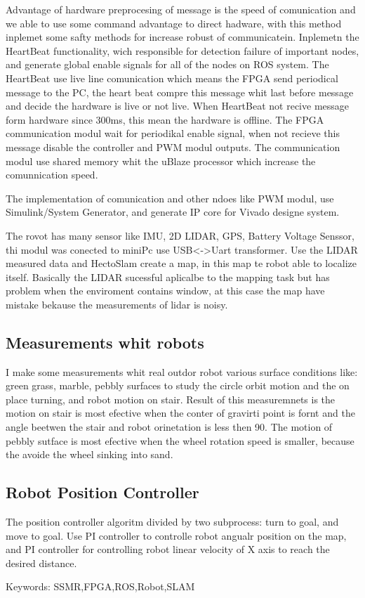 \begin{titlepage}
Advantage of hardware preprocesing of message is the speed of comunication and we able to use some command advantage to direct hadware, with this method inplemet some safty methods for increase robust of communicatein. Inplemetn the HeartBeat functionality, wich 
responsible for detection failure of important nodes, and generate global enable signals for all of the nodes on ROS system. The HeartBeat use live line comunication which means the FPGA send periodical message to the PC, the heart beat compre this message whit last before message and decide the hardware is live or not live. When HeartBeat not recive message form hardware since 300ms, this mean the hardware is offline. The FPGA communication modul wait for periodikal enable signal, when not recieve this message disable the controller and PWM modul outputs.
The communication modul use shared memory whit the uBlaze processor which increase the comunnication speed.

The implementation of comunication and other ndoes like PWM modul, use Simulink/System Generator, and generate IP core for Vivado designe system.

The rovot has many sensor like IMU, 2D LIDAR, GPS, Battery Voltage Senssor, thi modul was conected to miniPc use USB<->Uart transformer. Use the LIDAR measured data and HectoSlam create a map, in this map te robot able to localize itself. Basically the LIDAR sucessful aplicalbe to the mapping task but has problem when the enviroment contains window, at this case the map have mistake bekause the measurements of lidar is noisy.

\subsection{Measurements whit robots}

I make some measurements whit real outdor robot various surface conditions like: green grass, marble, pebbly surfaces to study the circle orbit motion and the on place turning, and robot motion on stair. Result of this measuremnets is the motion on stair is most efective when the conter of gravirti point is fornt and the angle beetwen the stair and robot orinetation is less then 90\degree. The motion of pebbly sutface is most efective when the wheel rotation speed is smaller, because the avoide the wheel sinking into sand.

\subsection{Robot Position Controller}

The position controller algoritm divided by two subprocess: turn to goal, and move to goal. Use PI controller to controlle robot angualr position on the map, and PI controller for controlling robot linear velocity of X axis to reach the desired distance.


Keywords: SSMR,FPGA,ROS,Robot,SLAM

\end{titlepage}
